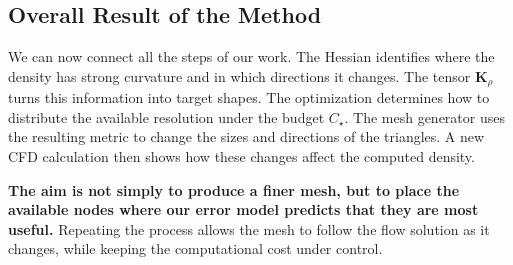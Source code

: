 \documentclass[11pt,a4paper]{article}
\begin{document}
\subsection{Overall Result of the Method}

\noindent We can now connect all the steps of our work.
The Hessian identifies where the density has strong
curvature and in which directions it changes. The tensor
$\mathbf K_\rho$ turns this information into target
shapes. The optimization determines how to distribute
the available resolution under the budget $C_\star$.
The mesh generator uses the resulting metric to change
the sizes and directions of the triangles. A new CFD
calculation then shows how these changes affect the
computed density.

\medskip

\noindent\textbf{The aim is not simply to produce a finer
mesh, but to place the available nodes where our error
model predicts that they are most useful.} Repeating the
process allows the mesh to follow the flow solution as
it changes, while keeping the computational cost under
control.
\end{document}

